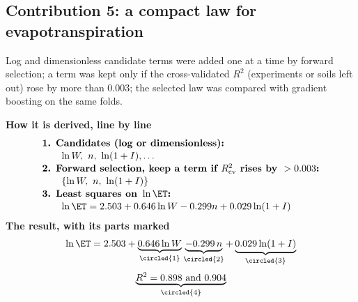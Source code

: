 \subsection{Contribution 5: a compact law for evapotranspiration}
\begin{derivation}
Log and dimensionless candidate terms were added one at a time by forward selection; a term was kept only if the cross-validated $R^2$ (experiments or soils left out) rose by more than 0.003; the selected law was compared with gradient boosting on the same folds.
\end{derivation}
\begin{keyresult}
\begin{pencil}
{\small\noindent\textbf{How it is derived, line by line}
\[\begin{array}{@{}l@{}}\textbf{1. Candidates (log or dimensionless):}\\[1pt]
\qquad \ln W,\ n,\ \ln(1+I),\dots\\[1pt]
\textbf{2. Forward selection, keep a term if } R^2_{\mathrm{cv}}\textbf{ rises by }>0.003\textbf{:}\\[1pt]
\qquad \{\ln W,\ n,\ \ln(1+I)\}\\[1pt]
\textbf{3. Least squares on } \ln\ET\textbf{:}\\[1pt]
\qquad \ln\ET=2.503+0.646\ln W-0.299n+0.029\ln(1+I)
\end{array}\]}
\noindent\textbf{The result, with its parts marked}
\[\ln\ET=2.503+\underbrace{0.646\ln W}_{\circled{1}}\underbrace{-0.299\,n}_{\circled{2}}+\underbrace{0.029\ln(1+I)}_{\circled{3}}\]
\[\underbrace{R^2=0.898\ \text{and}\ 0.904}_{\circled{4}}\]
\end{pencil}
\end{keyresult}
\begin{pins}
\end{pins}
